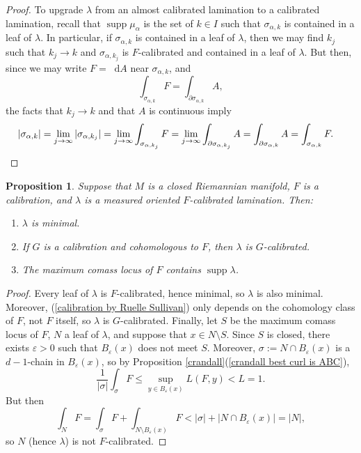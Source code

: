\documentclass[reqno,11pt]{amsart}
\newcommand*\dif{\mathop{}\!\mathrm{d}}
\DeclareMathOperator{\supp}{supp}
\newtheorem{proposition}[theorem]{Proposition}
\theoremstyle{definition}
\numberwithin{equation}{section}
\begin{document}
\begin{proof}
To upgrade $\lambda$ from an almost calibrated lamination to a calibrated lamination, recall that $\supp \mu_\alpha$ is the set of $k \in I$ such that $\sigma_{\alpha, k}$ is contained in a leaf of $\lambda$.
In particular, if $\sigma_{\alpha, k}$ is contained in a leaf of $\lambda$, then we may find $k_j$ such that $k_j \to k$ and $\sigma_{\alpha, k_j}$ is $F$-calibrated and contained in a leaf of $\lambda$.
But then, since we may write $F = \dif A$ near $\sigma_{\alpha, k}$, and 
$$\int_{\sigma_{\alpha, k}} F = \int_{\partial \sigma_{\alpha, k}} A,$$
the facts that $k_j \to k$ and that $A$ is continuous imply 
\begin{align*}
|\sigma_{\alpha, k}| &= \lim_{j \to \infty} |\sigma_{\alpha, k_j}| = \lim_{j \to \infty} \int_{\sigma_{\alpha, k_j}} F = \lim_{j \to \infty} \int_{\partial \sigma_{\alpha, k_j}} A = \int_{\partial \sigma_{\alpha, k}} A = \int_{\sigma_{\alpha, k}} F. \qedhere 
\end{align*}
\end{proof}

\begin{proposition}\label{properties of calibrated laminations}
Suppose that $M$ is a closed Riemannian manifold, $F$ is a calibration, and $\lambda$ is a measured oriented $F$-calibrated lamination.
Then:
\begin{enumerate}
\item $\lambda$ is minimal.
\item If $G$ is a calibration and cohomologous to $F$, then $\lambda$ is $G$-calibrated.
\item The maximum comass locus of $F$ contains $\supp \lambda$.
\end{enumerate}
\end{proposition}
\begin{proof}
Every leaf of $\lambda$ is $F$-calibrated, hence minimal, so $\lambda$ is also minimal.
Moreover, (\ref{calibration by Ruelle Sullivan}) only depends on the cohomology class of $F$, not $F$ itself, so $\lambda$ is $G$-calibrated.
Finally, let $S$ be the maximum comass locus of $F$, $N$ a leaf of $\lambda$, and suppose that $x \in N \setminus S$.
Since $S$ is closed, there exists $\varepsilon > 0$ such that $B_\varepsilon(x)$ does not meet $S$.
Moreover, $\sigma := N \cap B_\varepsilon(x)$ is a $d-1$-chain in $B_\varepsilon(x)$, so by Proposition \ref{crandall}(\ref{crandall best curl is ABC}),
$$\frac{1}{|\sigma|} \int_\sigma F \leq \sup_{y \in B_\varepsilon(x)} L(F, y) < L = 1.$$
But then 
$$\int_N F = \int_\sigma F + \int_{N \setminus B_\varepsilon(x)} F < |\sigma| + |N \cap B_\varepsilon(x)| = |N|,$$
so $N$ (hence $\lambda$) is not $F$-calibrated.
\end{proof}
\end{document}
